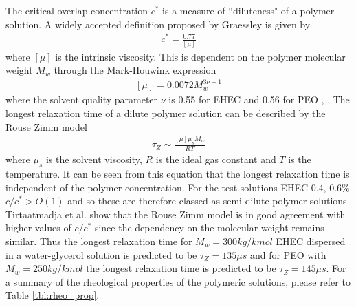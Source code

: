 \documentclass[11pt]{article}
\begin{document}
The critical overlap concentration $c^*$ is a measure of ``diluteness" of a polymer solution. A widely accepted definition proposed by Graessley \cite{graessley1980polymer} is given by 
\begin{align}
c^* = \frac{0.77}{\left[ \mu \right]}
\end{align}
where $\left[ \mu \right]$ is the intrinsic viscosity. This is dependent on the polymer molecular weight $M_w$ through the Mark-Houwink expression
\begin{align}
\left[\mu \right] = 0.0072 M_w^{3 \nu - 1}
\end{align}
where the solvent quality parameter $\nu$ is 0.55 for EHEC and 0.56 for PEO \cite{keshavarz2015studying}, \cite{sharma2015rheology}. The longest relaxation time of a dilute polymer solution can be described by the Rouse Zimm model
\begin{align}
\tau_{Z} \sim \frac{\left[\mu \right] \mu_s M_w}{RT}
\end{align}
where $\mu_s$ is the solvent viscosity, $R$ is the ideal gas constant and $T$ is the temperature. It can be seen from this equation that the longest relaxation time is independent of the polymer concentration. For the test solutions EHEC 0.4, 0.6\% $c/c^* > O(1)$ and so these are therefore classed as semi dilute polymer solutions. Tirtaatmadja et al. \cite{tirtaatmadja2006drop} show that the Rouse Zimm model is in good agreement with higher values of $c/c^*$ since the dependency on the molecular weight remains similar. Thus the longest relaxation time for $M_w = 300 kg/kmol$ EHEC dispersed in a water-glycerol solution is predicted to be $\tau_{Z} = 135 \mu s$ and for PEO with $M_w = 250 kg/kmol$ the longest relaxation time is predicted to be $\tau_Z = 145 \mu s$. For a summary of the rheological properties of the polymeric solutions, please refer to Table \ref{tbl:rheo_prop}. 
\end{document}
